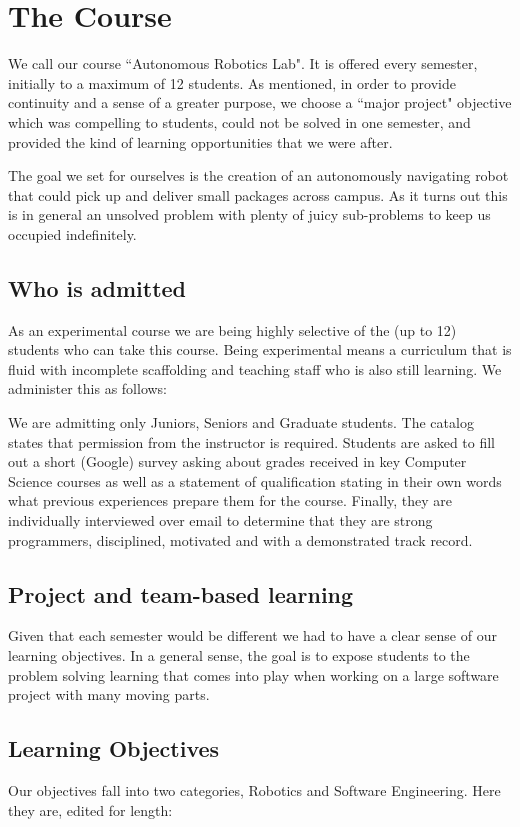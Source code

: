 \section{The Course}

We call our course ``Autonomous Robotics Lab". It is offered every semester, initially to a maximum of 12 students. As mentioned, in order to provide continuity and a sense of a greater purpose, we choose a ``major project" objective which was compelling to students, could not be solved in one semester, and provided the kind of learning opportunities that we were after. 

The goal we set for ourselves is the creation of an autonomously navigating robot that could pick up and deliver small packages across campus. As it turns out this is in general an unsolved problem with plenty of juicy sub-problems to keep us occupied indefinitely.

\subsection{Who is admitted} As an experimental course we are being highly selective of the (up to 12) students who can take this course. Being experimental means a curriculum that is fluid with incomplete scaffolding and teaching staff who is also still learning. We administer this as follows:

We are admitting only Juniors, Seniors and Graduate students. The catalog states that permission from the instructor is required. Students are asked to fill out a short (Google) survey asking about grades received in key Computer Science courses as well as a statement of qualification stating in their own words what previous experiences prepare them for the course. Finally, they are individually interviewed over email to determine that they are strong programmers, disciplined, motivated and with a demonstrated track record.

\subsection{Project and team-based learning} Given that each semester would be different we had to have a clear sense of our learning objectives. In a general sense, the goal is to expose students to the problem solving learning that comes into play when working on a large software project with many moving parts.

\subsection{Learning Objectives} Our objectives fall into two categories, Robotics and Software Engineering. Here they are, edited for length:

